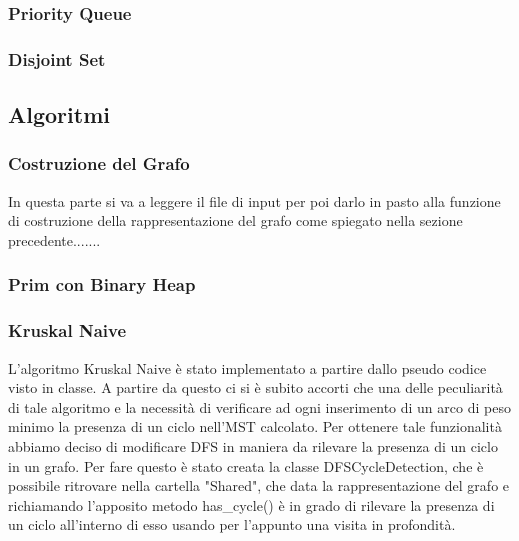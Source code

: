 \subsubsection{Priority Queue}

\subsubsection{Disjoint Set}

\subsection{Algoritmi}

\subsubsection {Costruzione del Grafo}
In questa parte si va a leggere il file di input per poi darlo in pasto alla funzione di costruzione della rappresentazione del grafo come spiegato nella sezione precedente.......

\subsubsection{Prim con Binary Heap}


\subsubsection{Kruskal Naive}
L'algoritmo Kruskal Naive è stato implementato a partire dallo pseudo codice visto in classe. A partire da questo ci si è subito accorti che una delle peculiarità di tale algoritmo e la necessità di verificare ad ogni inserimento di un arco di peso minimo la presenza di un ciclo nell'MST calcolato. Per ottenere tale funzionalità abbiamo deciso di modificare DFS in maniera da rilevare la presenza di un ciclo in un grafo. Per fare questo è stato creata la classe DFSCycleDetection, che è possibile ritrovare nella cartella "Shared", che data la rappresentazione del grafo e richiamando l'apposito metodo has\_cycle() è in grado di rilevare la presenza di un ciclo all'interno di esso usando per l'appunto una visita in profondità.\\

